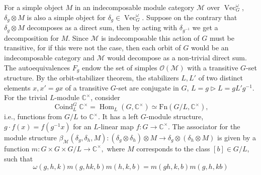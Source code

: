 \documentclass[a4paper, 10pt]{book}
\theoremstyle{definition}
\numberwithin{equation}{chapter}
\newcommand\hit{\triangleright}
\newcommand\inv{^{-1}}
\newcommand\ot{\otimes}
\newcommand\Coind{\operatorname{Coind}}
\newcommand\Vect{\operatorname{Vec}}
\newcommand\Hom{\operatorname{Hom}}
\newcommand\kk{\mathbb C}
\newcommand\M{\mathcal{M}}
\newcommand\OO{\mathcal O}
\begin{document}
For a simple object $M$ in an indecomposable module category $\mathcal{M}$ over $\Vect^\omega_G$,  $\delta_g \otimes M$ is also a simple object for $\delta_g \in \Vect^\omega_G$. Suppose on the contrary that $\delta_g \otimes M$ decomposes as a direct sum, then by acting with $\delta_{g\inv}$ we get a decomposition for $M$. Since $\M$ is indecomposable this action of $G$ must be transitive, for if this were not the case, then each orbit of $G$ would be an indecomposable category and $\M$ would decompose as a non-trivial direct sum. The autoequivalences $F_g$ endow the set of simples $\OO(\M)$ with a transitive $G$-set structure. By the orbit-stabilizer theorem,  the stabilizers $L, L'$ of two distinct elements $x, x'=gx$ of a transitive $G$-set are conjugate in $G$, $L = g\hit L = gL'g\inv$. For the trivial $L$-module $\kk^\times$, consider
\begin{equation*}
	\Coind^G_L \kk^\times = \Hom_L(G,\kk^\times)\simeq \text{Fn}(G/L, \kk^\times),
\end{equation*}
i.e., functions from $G/L$ to $\kk^\times$. It has a left $G$-module structure,  $g\cdot f(x) = f(g\inv x)$ for an $L$-linear map $f:G\rightarrow \kk^\times$.
The associator for the module structure  $\beta_\M (\delta_g,\delta_h,M): (\delta_g\ot \delta_h)\ot M\rightarrow \delta_g\ot (\delta_h\ot M)$  is given by a function $m:G\times G \times G/L\rightarrow \kk^\times,$ where $M$ corresponds to the class $[b]\in G/L$, such that
\begin{equation}\label{pent}
	\omega(g,h,k)m(g, hk, b)m(h, k, b) = m(gh, k, b)m(g, h, kb)
\end{equation}
\end{document}

